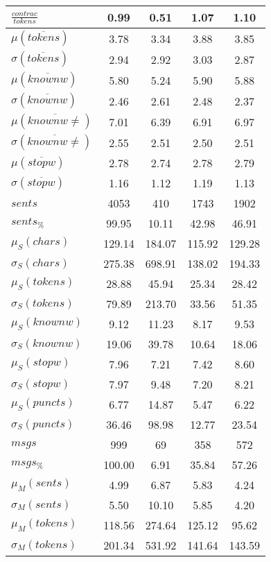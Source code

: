\begin{table}[h!]
\begin{center}
\begin{tabular}{| l || c | c | c | c |}
$\frac{contrac}{tokens}$ & 0.99  & 0.51  & 1.07  & 1.10 \\\hline\hline
$\mu(\overline{tokens})$ & 3.78  & 3.34  & 3.88  & 3.85 \\
$\sigma(\overline{tokens})$ & 2.94  & 2.92  & 3.03  & 2.87 \\\hline
$\mu(\overline{knownw})$ & 5.80  & 5.24  & 5.90  & 5.88 \\
$\sigma(\overline{knownw})$ & 2.46  & 2.61  & 2.48  & 2.37 \\\hline
$\mu(\overline{knownw \neq})$ & 7.01  & 6.39  & 6.91  & 6.97 \\
$\sigma(\overline{knownw \neq})$ & 2.55  & 2.51  & 2.50  & 2.51 \\\hline
$\mu(\overline{stopw})$ & 2.78  & 2.74  & 2.78  & 2.79 \\
$\sigma(\overline{stopw})$ & 1.16  & 1.12  & 1.19  & 1.13 \\\hline\hline
$sents$ & 4053  & 410  & 1743  & 1902 \\
$sents_{\%}$ & 99.95  & 10.11  & 42.98  & 46.91 \\\hline
$\mu_S(chars)$ & 129.14  & 184.07  & 115.92  & 129.28 \\
$\sigma_S(chars)$ & 275.38  & 698.91  & 138.02  & 194.33 \\\hline
$\mu_S(tokens)$ & 28.88  & 45.94  & 25.34  & 28.42 \\
$\sigma_S(tokens)$ & 79.89  & 213.70  & 33.56  & 51.35 \\\hline
$\mu_S(knownw)$ & 9.12  & 11.23  & 8.17  & 9.53 \\
$\sigma_S(knownw)$ & 19.06  & 39.78  & 10.64  & 18.06 \\\hline
$\mu_S(stopw)$ & 7.96  & 7.21  & 7.42  & 8.60 \\
$\sigma_S(stopw)$ & 7.97  & 9.48  & 7.20  & 8.21 \\\hline
$\mu_S(puncts)$ & 6.77  & 14.87  & 5.47  & 6.22 \\
$\sigma_S(puncts)$ & 36.46  & 98.98  & 12.77  & 23.54 \\\hline\hline
$msgs$ & 999  & 69  & 358  & 572 \\
$msgs_{\%}$ & 100.00  & 6.91  & 35.84  & 57.26 \\\hline
$\mu_M(sents)$ & 4.99  & 6.87  & 5.83  & 4.24 \\
$\sigma_M(sents)$ & 5.50  & 10.10  & 5.85  & 4.20 \\\hline
$\mu_M(tokens)$ & 118.56  & 274.64  & 125.12  & 95.62 \\
$\sigma_M(tokens)$ & 201.34  & 531.92  & 141.64  & 143.59 \\\hline

\end{tabular}
\end{center}
\end{table}
